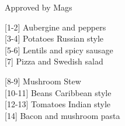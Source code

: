 		\begin{menu}{Approved by Mags}
    
    \begin{recipelist}
    
        {\scriptsize[1-2]} Aubergine and peppers\\
        {\scriptsize[3-4]} Potatoes Russian style\\
        {\scriptsize[5-6]} Lentils and spicy sausage\\
        {\scriptsize[7]} Pizza and Swedish salad\\%
    \end{recipelist}%
    \begin{recipelist}
    
        {\scriptsize[8-9]} Mushroom Stew\\
        {\scriptsize[10-11]} Beans Caribbean style\\
        {\scriptsize[12-13]} Tomatoes Indian style\\
        {\scriptsize[14]} Bacon and mushroom pasta\\%
    \end{recipelist}\par%
  

\end{menu}

